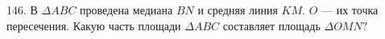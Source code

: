 146. В $\Delta ABC$ проведена медиана $BN$ и средняя линия $KM.$ $O$ --- их точка пересечения. Какую часть площади $\Delta ABC$ составляет площадь $\Delta OMN?$\\
